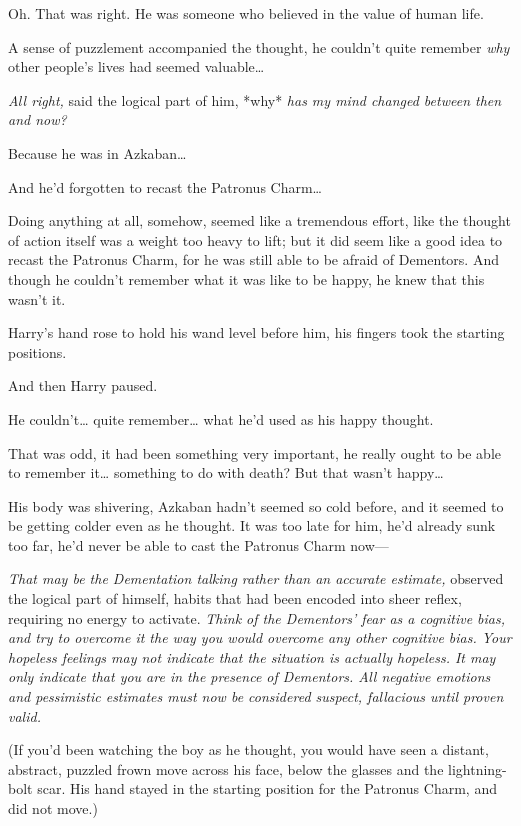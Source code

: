 Oh. That was right. He was someone who believed in the value of human
life.

A sense of puzzlement accompanied the thought, he couldn't quite
remember \emph{why} other people's lives had seemed valuable\ldots{}

\emph{All right,} said the logical part of him, *why* \emph{has my mind
changed between then and now?}

Because he was in Azkaban\ldots{}

And he'd forgotten to recast the Patronus Charm\ldots{}

Doing anything at all, somehow, seemed like a tremendous effort, like
the thought of action itself was a weight too heavy to lift; but it did
seem like a good idea to recast the Patronus Charm, for he was still
able to be afraid of Dementors. And though he couldn't remember what it
was like to be happy, he knew that this wasn't it.

Harry's hand rose to hold his wand level before him, his fingers took
the starting positions.

And then Harry paused.

He couldn't\ldots{} quite remember\ldots{} what he'd used as his happy
thought.

That was odd, it had been something very important, he really ought to
be able to remember it\ldots{} something to do with death? But that
wasn't happy\ldots{}

His body was shivering, Azkaban hadn't seemed so cold before, and it
seemed to be getting colder even as he thought. It was too late for him,
he'd already sunk too far, he'd never be able to cast the Patronus Charm
now---

\emph{That may be the Dementation talking rather than an accurate
estimate,} observed the logical part of himself, habits that had been
encoded into sheer reflex, requiring no energy to activate. \emph{Think
of the Dementors' fear as a cognitive bias, and try to overcome it the
way you would overcome any other cognitive bias. Your hopeless feelings
may not indicate that the situation is actually hopeless. It may only
indicate that you are in the presence of Dementors. All negative
emotions and pessimistic estimates must now be considered suspect,
fallacious until proven valid.}

(If you'd been watching the boy as he thought, you would have seen a
distant, abstract, puzzled frown move across his face, below the glasses
and the lightning-bolt scar. His hand stayed in the starting position
for the Patronus Charm, and did not move.)

